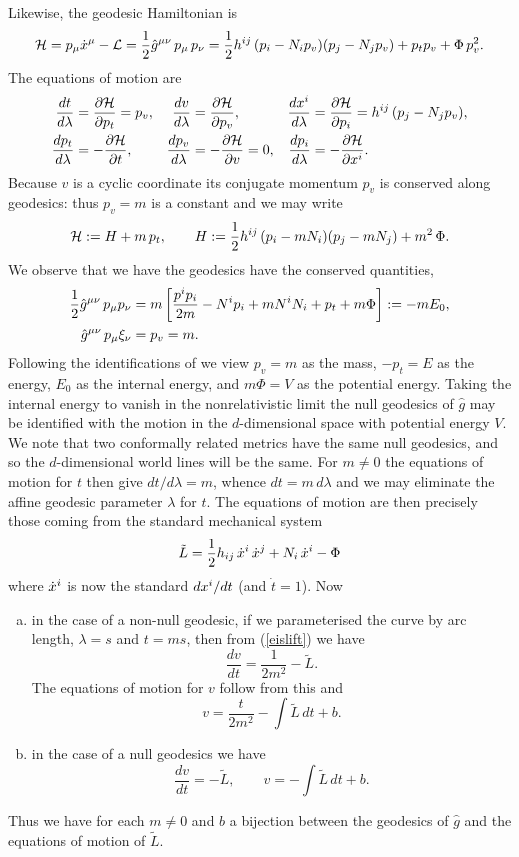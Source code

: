 \documentclass{article}
\begin{document}
Likewise, the geodesic Hamiltonian is
$$\mathcal{H}=p_\mu \dot x\sp{\mu}-\mathcal{L} = \frac12 \hat{g}\sp{\mu\nu}\,p_{\mu}\, p_{\nu}=
\frac12 h\sp{ij}\, (p_{i}-N_i p_v)(p_j-N_j p_v) +p_t  p_v+\Phi \,p_v^2 .
$$
The equations of motion are
\begin{align*}
	\frac{dt}{d\lambda}&=\frac{\partial \mathcal{H}}{\partial p_t}=p_v, &
	\frac{dv}{d\lambda}&=\frac{\partial \mathcal{H}}{\partial p_v},& 
	\frac{d x^i}{d\lambda}&=\frac{\partial \mathcal{H}}{\partial p_i}=h\sp{ij}\, (p_j-N_j p_v),
	\\
	\frac{d p_t}{d\lambda}&=-\frac{\partial \mathcal{H}}{\partial t},
	&
	\frac{d p_v}{d\lambda}&=-\frac{\partial \mathcal{H}}{\partial v}=0,&
	\frac{d p_i}{d\lambda}&=-\frac{\partial \mathcal{H}}{\partial x^i}.
\end{align*}
Because $v$ is a cyclic coordinate its conjugate momentum $p_v$ is conserved along geodesics:
thus $p_v=m$ is a constant and we may write
$$\mathcal{H}:=H+m\, p_t,\qquad H:=\frac12 h\sp{ij}\, (p_{i}-m N_i )(p_j-m N_j) +m^2\, \Phi.$$
We observe that we have the geodesics have the conserved quantities,
\begin{align*}
	\frac12 \hat g\sp{\mu\nu}\, p_\mu p_\nu&=m\left[ \frac{p\sp{i}p_i}{2m}- N\sp{i}p_i +m N\sp{i}N_i
	+p_t +m\Phi \right] :=- m E_0,\\
	\hat g\sp{\mu\nu}\, p_\mu \xi_\nu&=p_v=m.
\end{align*}
Following the identifications of \cite{Duval1991} we view $p_v=m$ as the mass, $-p_t=E$  as the energy,
$E_0$ as the internal energy, and $m\Phi=V$ as the potential energy. Taking the internal energy to vanish in the nonrelativistic limit the null geodesics of $\hat g$ may be identified with the motion in the $d$-dimensional space with potential energy $V$. We note that two conformally related metrics have the same null geodesics, and so the $d$-dimensional world lines will be the same. For $m\ne 0$ the equations of motion for $t$ then give $dt/d\lambda=m$, whence $dt =m\,d\lambda$ and we may eliminate the affine geodesic parameter $\lambda$
for $t$. The equations of motion are then precisely those coming from the standard mechanical system
$$\tilde L= \frac12 h_{ij}\, \dot x\sp{i}\, \dot x\sp{j}+N_i \,\dot x\sp{i}-\Phi $$
where $ \dot x\sp{i}$ is now the standard $d x\sp{i}/dt$ (and $\dot t = 1$). Now
\begin{enumerate}[(a)]
	\item in the case of a non-null geodesic, if we parameterised the curve by arc length, $\lambda=s$ and $t =ms$, then from (\ref{eislift}) we have 
	$$\frac{dv}{dt}= \frac1{2m^2} -\tilde L.$$
	The equations of motion for $v$ follow from this and
	$$v=\frac{t}{2m^2}-\int \tilde L\, dt +b.$$
	\item in the case of a null geodesics we have
	$$\frac{dv}{dt}=  -\tilde L,\qquad  v=-\int \tilde L\, dt +b.$$
\end{enumerate}
Thus we have for each $m\ne0$ and $b$ a bijection between the geodesics of $\hat g$ and the
equations of motion of $\tilde L$.
\end{document}
